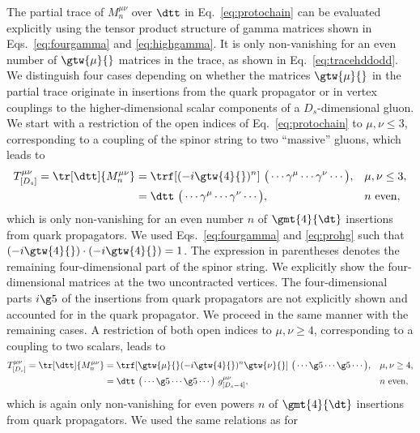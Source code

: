 The partial trace of $M^{\mu\nu}_n$ over $\dtt$ in
Eq.~\eqref{eq:protochain} can be evaluated explicitly using the tensor
product structure of gamma matrices shown in Eqs.~\eqref{eq:fourgamma}
and \eqref{eq:highgamma}. It is only non-vanishing
for an even number of $\gtw{\mu}{}$ matrices in the trace, as shown in
Eq.~\eqref{eq:tracehddodd}. We distinguish four cases depending on
whether the matrices $\gtw{\mu}{}$ in the partial trace originate in insertions from the
quark propagator or in vertex couplings to the higher-dimensional
scalar components of a $D_s$-dimensional gluon. We start with a restriction of the
open indices of Eq.~\eqref{eq:protochain} to $\mu,\nu \leq 3$, corresponding to a coupling of the
spinor string to two ``massive'' gluons, which leads to 
\begin{subequations}
\begin{align}
    T^{\mu\nu}_{[D_s]} = \tr[\dtt]{M^{\mu\nu}_n} &=\trf[(-i\gtw{4}{})^n] ~ \big(\cdots \gamma^{\mu}\cdots\gamma^{\nu}\cdots\big), &&\mu,\nu \leq 3,\\\label{eq:mgcont}
&= \dtt  ~ \big(\cdots \gamma^{\mu}\cdots\gamma^{\nu}\cdots\big), &&n\text{ even},
\end{align}
\end{subequations}
which is only non-vanishing for an even number $n$ of $\gmt{4}{\dt}$
insertions from quark propagators. We used Eqs.~\eqref{eq:fourgamma}
and \eqref{eq:prohg} such that $(-i\gtw{4}{})\cdot(-i\gtw{4}{})=1$. The expression in parentheses denotes the remaining
four-dimensional part of the spinor string. We explicitly show the four-dimensional
matrices at the two uncontracted vertices. The four-dimensional parts
$i\g5$ of the insertions from quark
propagators are not explicitly shown and accounted for in the quark propagator. We proceed in the same manner with the
remaining cases. A restriction of both open indices to $\mu,\nu \geq
4$, corresponding to a coupling to two scalars, leads to
\begin{subequations}
\begin{align}
    T^{\mu\nu}_{[D_s]} = \tr[\dtt]{M^{\mu\nu}_n} &=\trf[\gtw{\mu}{}(-i\gtw{4}{})^n\gtw{\nu}{}] ~ \big(\cdots \g5\cdots\g5\cdots\big), &&\mu,\nu \geq 4,\\\label{eq:twosccont}
&= \dtt ~ \big(\cdots \g5\cdots\g5\cdots\big) ~ g_{[D_s-4]}^{\mu\nu}, &&n\text{ even},
\end{align}
\end{subequations}
which is again only non-vanishing for even powers $n$ of $\gmt{4}{\dt}$
insertions from quark propagators. We used the same relations as for
